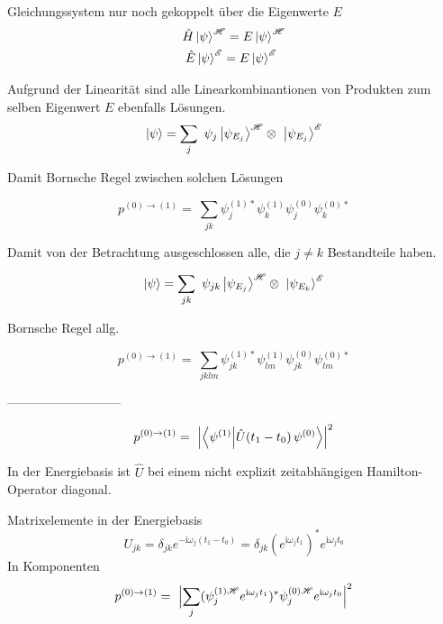 \documentclass[12pt]{article}
\begin{document}
Gleichungssystem nur noch gekoppelt über die Eigenwerte $E$
\begin{equation}
\begin{split}
\hat{H}\ket{\psi}^{\mathscr{H}} = E\ket{\psi}^{\mathscr{H}}\\
\hat{E}\ket{\psi}^{\mathscr{E}} = E\ket{\psi}^{\mathscr{E}}\ \ 
\end{split}
\end{equation}

Aufgrund der Linearität sind alle Linearkombinantionen von Produkten zum selben Eigenwert $E$ ebenfalls Lösungen.
\begin{equation}
\ket{\psi} = \sum_j\ \psi_j \ket{\psi_{E_j}}^{\mathscr{H}} \otimes\ \ket{\psi_{E_j}}^{\mathscr{E}}
\end{equation}


Damit Bornsche Regel zwischen solchen Lösungen

\begin{equation} 
p^{(0)\rightarrow(1)} =\ \sum_{jk} \psi_j^{(1)*}\psi_k^{(1)}\psi_j^{(0)}\psi_k^{(0)*}
\end{equation}

Damit von der Betrachtung ausgeschlossen alle, die $j \neq k$ Bestandteile haben.

\begin{equation}
\ket{\psi} = \sum_{jk}\ \psi_{jk} \ket{\psi_{E_j}}^{\mathscr{H}} \otimes\ \ket{\psi_{E_k}}^{\mathscr{E}}
\end{equation}

Bornsche Regel allg.

\begin{equation} 
p^{(0)\rightarrow(1)} =\ \sum_{jklm} \psi_{jk}^{(1)*}\psi_{lm}^{(1)}\psi_{jk}^{(0)}\psi_{lm}^{(0)*}
\end{equation}


---------------------------

\begin{equation} 
\label{eq:conditional_probability}
p^{(0)\rightarrow(1)} =\ \Bigl| \bra{\psi^{(1)}}\ket{\hat{U}(t_1-t_0)\,\psi^{(0)}} \Bigr|^2
\end{equation}

In der Energiebasis ist $\hat{U}$ bei einem nicht explizit zeitabhängigen Hamilton-Operator diagonal.

Matrixelemente in der Energiebasis
\begin{equation} 
U_{jk} = \delta_{jk} e^{-\mathrm{i}\omega_j(t_1-t_0)}
= 
\delta_{jk}(e^{\mathrm{i}\omega_j t_1})^* e^{\mathrm{i}\omega_j t_0}
\end{equation}
In Komponenten
\begin{equation} 
p^{(0)\rightarrow(1)} =\ 
\Bigl| \sum_j
(\psi_j^{(1)\mathscr{H}} e^{\mathrm{i}\omega_j t_1})^*
\psi_j^{(0)\mathscr{H}} e^{\mathrm{i}\omega_j t_0}
 \Bigr|^2
\end{equation}
\end{document}
